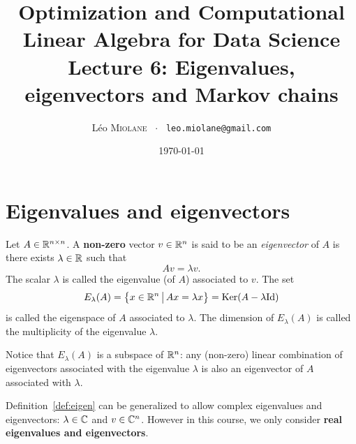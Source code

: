 \documentclass[11pt,nocut]{article}
\title{\vspace{-2.0cm}%
	Optimization and Computational Linear Algebra for Data Science\\
Lecture 6: Eigenvalues, eigenvectors and Markov chains}
\author{Léo \textsc{Miolane} \ $\cdot$ \ \texttt{leo.miolane@gmail.com}}
\date{\today}
\begin{document}
\maketitle


\section{Eigenvalues and eigenvectors}

\begin{definition}\label{def:eigen}
	Let $A \in \mathbb{R}^{n \times n}$. A \textbf{non-zero} vector $v \in \mathbb{R}^n$ is said to be an \emph{eigenvector} of $A$ is there exists $\lambda \in \mathbb{R}$ such that
	$$
	A v = \lambda v.
	$$
	The scalar $\lambda$ is called the eigenvalue (of $A$) associated to $v$. The set
	$$
	E_{\lambda}(A) = \big\{ x \in \mathbb{R}^n \, \big| \, Ax = \lambda x \big\} = {{\rm Ker}}(A-\lambda {{\rm Id}})
	$$
	is called the eigenspace of $A$ associated to $\lambda$. The dimension of $E_{\lambda}(A)$ is called the multiplicity of the eigenvalue $\lambda$.
\end{definition}

\begin{remark}
	Notice that $E_{\lambda}(A)$ is a subspace of $\mathbb{R}^n$: any (non-zero) linear combination of eigenvectors associated with the eigenvalue $\lambda$ is also an eigenvector of $A$ associated with $\lambda$.
\end{remark}

\begin{remark}
	Definition~\ref{def:eigen} can be generalized to allow complex eigenvalues and eigenvectors: $\lambda \in \mathbb{C}$ and $v \in \mathbb{C}^n$.
	However in this course, we only consider \textbf{real eigenvalues and eigenvectors}. 
\end{remark}
\end{document}
